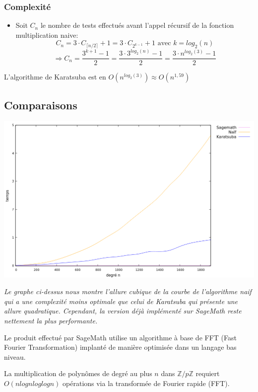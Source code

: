 \documentclass[a4paper]{article}
\begin{document}
\subsubsection*{Complexité}
\begin{itemize}
    \item Soit $C_n$ le nombre de tests effectués avant l'appel récursif de la fonction multiplication naive:
    $$C_n = 3\cdot {C_{\lceil n/2 \rceil}} + 1 = 3\cdot {C_{2^{k-1}}} + 1 \text{ avec } k = log_2(n)$$
    $$\Longrightarrow C_n = \dfrac{3^{k+1} - 1}{2} = \dfrac{3\cdot {3}^{log_2(n)} - 1}{2} = \dfrac{3\cdot{n}^{log_2(3)} - 1}{2} $$
    
\end{itemize}
L'algorithme de Karatsuba est en $O(n^{log_2(3)}) \approx O(n^{1,59})$

\subsection{Comparaisons}

\includegraphics[scale=0.5, center]{multi.png}

\textit{
Le graphe ci-dessus nous montre l'allure cubique de la courbe de l'algorithme naif qui a une complexité moins optimale que celui de Karatsuba qui présente une allure quadratique. 
Cependant, la version déjà implémenté sur SageMath reste nettement la plus performante.
}

\bigskip
Le produit effectué par SageMath utilise un algorithme à base de FFT (Fast Fourier Transformation) implanté de manière optimisée dans un langage bas niveau.


\begin{Theorem}
La multiplication de polynômes de degré au plus $n$ dans $\mathbb{Z}/p\mathbb{Z}$ requiert $O(nlognloglogn)$ opérations via la transformée de Fourier rapide (FFT).
\cite{aecf-2017-livre}
\end{Theorem}
\end{document}
